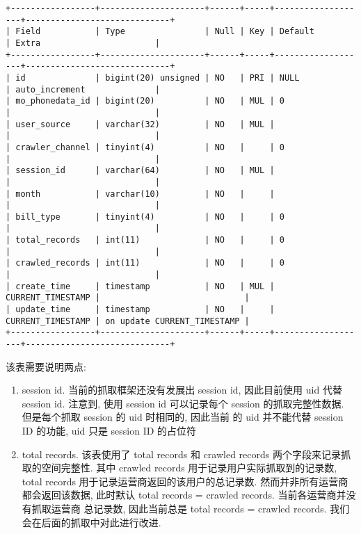 \documentclass[UTF8]{ctexart}
\begin{document}
\begin{verbatim}
+-----------------+---------------------+------+-----+-------------------+-----------------------------+
| Field           | Type                | Null | Key | Default           | Extra                       |
+-----------------+---------------------+------+-----+-------------------+-----------------------------+
| id              | bigint(20) unsigned | NO   | PRI | NULL              | auto_increment              |
| mo_phonedata_id | bigint(20)          | NO   | MUL | 0                 |                             |
| user_source     | varchar(32)         | NO   | MUL |                   |                             |
| crawler_channel | tinyint(4)          | NO   |     | 0                 |                             |
| session_id      | varchar(64)         | NO   | MUL |                   |                             |
| month           | varchar(10)         | NO   |     |                   |                             |
| bill_type       | tinyint(4)          | NO   |     | 0                 |                             |
| total_records   | int(11)             | NO   |     | 0                 |                             |
| crawled_records | int(11)             | NO   |     | 0                 |                             |
| create_time     | timestamp           | NO   | MUL | CURRENT_TIMESTAMP |                             |
| update_time     | timestamp           | NO   |     | CURRENT_TIMESTAMP | on update CURRENT_TIMESTAMP |
+-----------------+---------------------+------+-----+-------------------+-----------------------------+
\end{verbatim}

该表需要说明两点:
\begin{enumerate}
	\item session id. 当前的抓取框架还没有发展出 session id, 因此目前使用 uid 代替 session id. 注意到,
使用 session id 可以记录每个 session 的抓取完整性数据. 但是每个抓取 session 的 uid 时相同的, 因此当前
的 uid 并不能代替 session ID 的功能, uid 只是 session ID 的占位符

	\item total records. 该表使用了 total records 和 crawled records 两个字段来记录抓取的空间完整性. 
其中 crawled records 用于记录用户实际抓取到的记录数, total records 用于记录运营商返回的该用户的总记录数.
然而并非所有运营商都会返回该数据, 此时默认 total records = crawled records. 当前各运营商并没有抓取运营商
总记录数, 因此当前总是 total records = crawled records. 我们会在后面的抓取中对此进行改进.
\end{enumerate}
\end{document}
